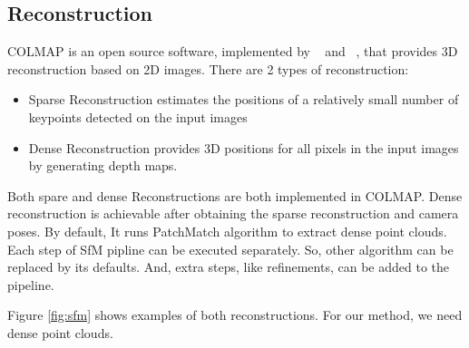 \documentclass[11pt]{article}
\begin{document}
    \subsection{Reconstruction}
    COLMAP is an open source software, implemented by ~\cite{schoenberger2016sfm} and ~\cite{schoenberger2016mvs},
    that provides 3D reconstruction based on 2D images. There are 2 types of reconstruction:
    \begin{itemize}
        \item Sparse Reconstruction estimates the positions of a relatively small number of keypoints detected on the input images
        \item Dense Reconstruction provides 3D positions for all pixels in the input images by generating depth maps.
    \end{itemize}
    Both spare and dense Reconstructions are both implemented in COLMAP.
    Dense reconstruction is achievable after obtaining
    the sparse reconstruction and camera poses. By default, It runs PatchMatch algorithm \cite{journals/tog/BarnesSFG09} to extract dense point clouds.
    Each step of SfM pipline can be executed separately. So, other algorithm can be replaced by its defaults. And, extra steps, like refinements, can be added to the pipeline.


    Figure \ref{fig:sfm} shows examples of both reconstructions.
    For our method, we need dense point clouds.
\end{document}
